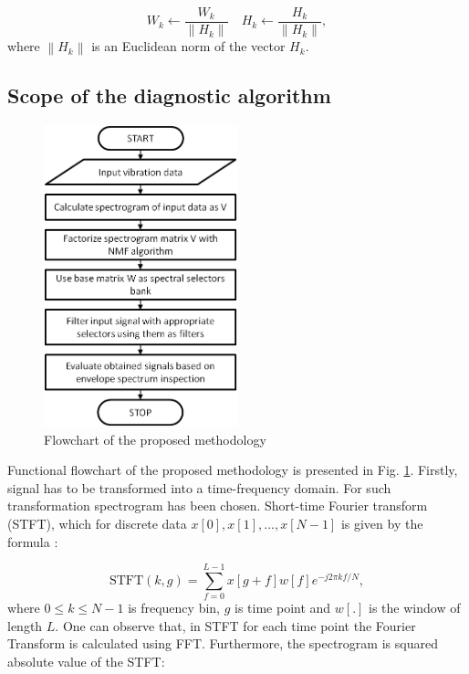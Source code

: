 \documentclass[preprint,12pt]{elsarticle}
\newcommand{\norm}[1]{\left\lVert#1\right\rVert}
\begin{document}
\begin{equation}
    W_{k} \leftarrow \frac{W_{k}}{\norm{H_{k}}}
    \quad
    H_{k} \leftarrow \frac{H_{k}}{\norm{H_{k}}},
\end{equation}
where $\norm{H_{k}}$ is an Euclidean norm of the vector $H_{k}$.

\subsection{Scope of the diagnostic algorithm}

\begin{figure}[!ht]
\centering
\includegraphics[width = 0.5\textwidth]{figs3/block.png}
\caption{Flowchart of the proposed methodology}
\label{fig: block}
\end{figure}


Functional flowchart of the proposed methodology is presented in Fig. \ref{fig: block}. Firstly, signal has to be transformed into a time-frequency domain. For such transformation spectrogram has been chosen. Short-time Fourier transform (STFT), which for discrete data $x[0], x[1], ... , x[N-1]$ is given by the formula \cite{allen1977short}:

\begin{equation}
    \textrm{STFT}(k,g)=\sum_{f=0}^{L-1}x[g+f]w[f]e^{-j2\pi kf/N},
\end{equation}
where $0\leq k \leq N-1$ is frequency bin, $g$ is time point and  $w[.]$ is the window of length $L$. One can observe that, in STFT for each time point the Fourier Transform is calculated using FFT. Furthermore, the spectrogram is squared absolute value of the STFT:
\end{document}

